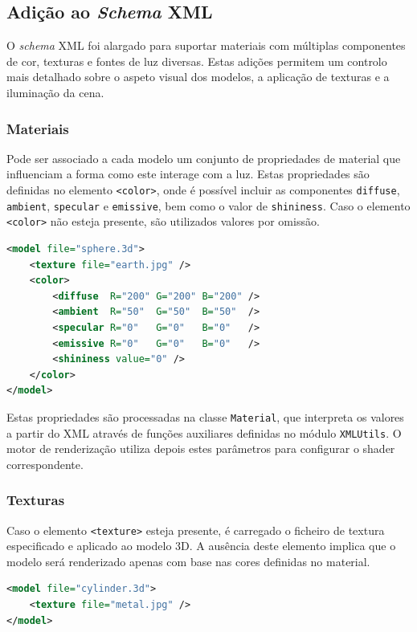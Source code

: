 \documentclass[12pt, a4paper]{article}
\begin{document}
\subsection{Adição ao \emph{Schema} XML}

O \emph{schema} XML foi alargado para suportar materiais com múltiplas componentes de cor, texturas
e fontes de luz diversas. Estas adições permitem um controlo mais detalhado sobre o aspeto visual
dos modelos, a aplicação de texturas e a iluminação da cena.

\subsubsection{Materiais}

Pode ser associado a cada modelo um conjunto de propriedades de material que influenciam a forma
como este interage com a luz. Estas propriedades são definidas no elemento \texttt{<color>}, onde é
possível incluir as componentes \texttt{diffuse}, \texttt{ambient}, \texttt{specular} e
\texttt{emissive}, bem como o valor de \texttt{shininess}. Caso o elemento \texttt{<color>} não
esteja presente, são utilizados valores por omissão.

\begin{lstlisting}[language=xml]
<model file="sphere.3d">
    <texture file="earth.jpg" />
    <color>
        <diffuse  R="200" G="200" B="200" />
        <ambient  R="50"  G="50"  B="50"  />
        <specular R="0"   G="0"   B="0"   />
        <emissive R="0"   G="0"   B="0"   />
        <shininess value="0" />
    </color>
</model>
\end{lstlisting}

Estas propriedades são processadas na classe \texttt{Material}, que interpreta os valores a partir
do XML através de funções auxiliares definidas no módulo \texttt{XMLUtils}. O motor de renderização
utiliza depois estes parâmetros para configurar o shader correspondente.

\subsubsection{Texturas}

Caso o elemento \texttt{<texture>} esteja presente, é carregado o ficheiro de textura especificado
e aplicado ao modelo 3D. A ausência deste elemento implica que o modelo será renderizado apenas com
base nas cores definidas no material.

\begin{lstlisting}[language=xml]
<model file="cylinder.3d">
    <texture file="metal.jpg" />
</model>
\end{lstlisting}
\end{document}
